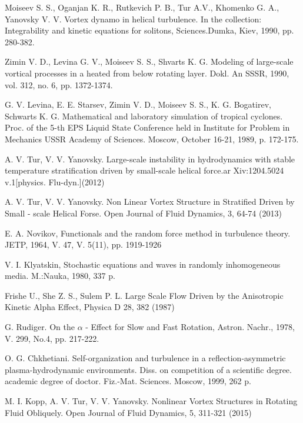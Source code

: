 \documentclass [12pt]{article}
\begin{document}
\begin{thebibliography}{21}
 Moiseev S. S., Oganjan  K. R., Rutkevich P. B., Tur  A.V., Khomenko G. A., Yanovsky V. V. Vortex dynamo in helical turbulence. In the collection: Integrability and kinetic equations for solitons, Sciences.Dumka, Kiev, 1990, pp. 280-382.

 Zimin V. D., Levina G. V., Moiseev S. S., Shvarts K. G. Modeling of large-scale vortical processes in a heated from below rotating layer. Dokl. An SSSR, 1990, vol. 312, no. 6, pp. 1372-1374.

 G. V. Levina, E. E. Starsev, Zimin V. D., Moiseev S. S., K. G. Bogatirev, Schwarts K. G. Mathematical and laboratory simulation of tropical cyclones. Proc. of the 5-th EPS Liquid State Conference held in Institute for Problem in Mechanics USSR Academy of Sciences. Moscow, October 16-21, 1989, p. 172-175.

 A. V. Tur, V. V. Yanovsky.  Large-scale instability in hydrodynamics with stable temperature stratification driven by small-scale helical force.ar Xiv:1204.5024 v.1[physics. Flu-dyn.](2012)

 A. V. Tur, V. V. Yanovsky.  Non Linear Vortex Structure in Stratified Driven by Small - scale Helical Forse. Open Journal of Fluid Dynamics, 3, 64-74 (2013)

 E. A. Novikov, Functionals and the random force method in turbulence theory. JETP, 1964, V. 47, V. 5(11), pp. 1919-1926

 V. I. Klyatskin, Stochastic equations and waves in randomly inhomogeneous media. M.:Nauka, 1980, 337 p.

 Frishe U., She Z. S., Sulem P. L. Large Scale Flow Driven by the Anisotropic Kinetic Alpha Effect, Physica D 28, 382 (1987)

 G. Rudiger.  On the    $\alpha$ - Effect for Slow and Fast Rotation, Astron. Nachr., 1978, V. 299, No.4, pp. 217-222.

 O. G. Chkhetiani. Self-organization and turbulence in a reflection-asymmetric plasma-hydrodynamic environments. Diss. on competition of a scientific degree. academic degree of doctor. Fiz.-Mat. Sciences. Moscow, 1999, 262 p.

 M. I. Kopp, A. V. Tur, V. V. Yanovsky. Nonlinear Vortex Structures in Rotating Fluid Obliquely. Open Journal of Fluid Dynamics, 5, 311-321 (2015)

\end{thebibliography}
\end{document}
